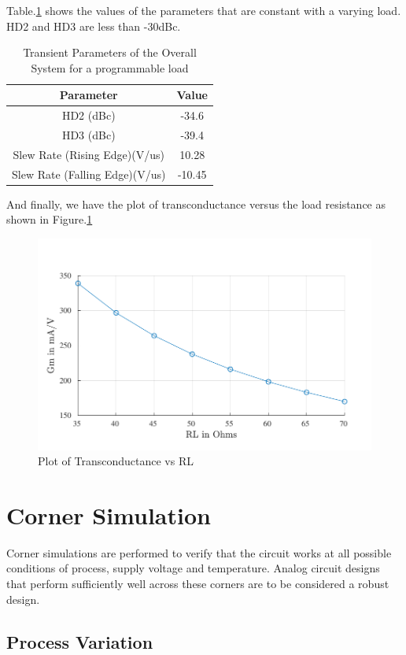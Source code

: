 Table.\ref{tab:RL_trans_2} shows the values of the parameters that are constant with a varying load. HD2 and HD3 are less than -30dBc.
\begin{table} [H]
\centering
\begin{tabular}{@{}cc@{}}
\toprule
Parameter							& Value		\\ \midrule
HD2 (dBc)							& -34.6 			\\
HD3 (dBc)							& -39.4 			\\
Slew Rate (Rising Edge)(V/us)		& 10.28 			\\
Slew Rate (Falling Edge)(V/us)		& -10.45 			\\
\bottomrule
\end{tabular}
\caption{Transient Parameters of the Overall System for a programmable load}
\label{tab:RL_trans_2}
\end{table}
And finally, we have the plot of transconductance versus the load resistance as shown in Figure.\ref{fig:RL_Gm}
\begin{figure} [H]
\centering
\includegraphics[scale=1]{Figures/Plots/Ov_Gm_RL.pdf}
\caption{Plot of Transconductance vs RL}
\label{fig:RL_Gm}
\end{figure}

\section{Corner Simulation}

Corner simulations are performed to verify that the circuit works at all possible conditions of process, supply voltage and temperature. Analog circuit designs that perform sufficiently well across these corners are to be considered a robust design.

\subsection{Process Variation}

